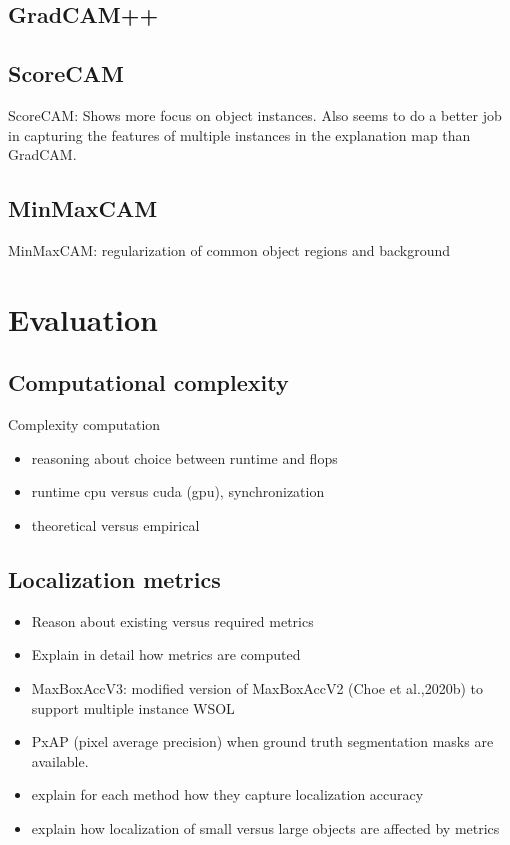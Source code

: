 \subsection{GradCAM++}

\subsection{ScoreCAM}
ScoreCAM: Shows more focus on object instances. Also seems to do a better job in capturing the features of multiple instances in the explanation map than GradCAM.

\subsection{MinMaxCAM}
MinMaxCAM: regularization of common object regions and background

\section{Evaluation}
\subsection{Computational complexity}
Complexity computation
\begin{itemize}
    \item reasoning about choice between runtime and flops
    \item runtime cpu versus cuda (gpu), synchronization
    \item theoretical versus empirical
\end{itemize}

\subsection{Localization metrics}
\begin{itemize}
    \item Reason about existing versus required metrics
    \item Explain in detail how metrics are computed
    \item MaxBoxAccV3: modified version of MaxBoxAccV2 (Choe et al.,2020b) to support multiple instance WSOL
    \item PxAP (pixel average precision) when ground truth segmentation masks are available.
    \item explain for each method how they capture localization accuracy
    \item explain how localization of small versus large objects are affected by metrics
\end{itemize}

